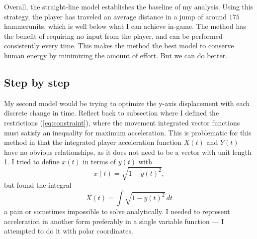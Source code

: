 Overall, the straight-line model establishes the baseline of my analysis. Using this strategy, the player has traveled an average distance in a jump of around $175$ hammerunits, which is well below what I can achieve in-game. The method has the benefit of requiring no input from the player, and can be performed consistently every  time. This makes the method the best model to conserve human energy by minimizing the amount of effort. But we can do better.





\subsection{Step by step}
My second model would be trying to optimize the y-axis displacement with each discrete change in time. Reflect back to subsection where I defined the restrictions (\ref{eq:constraint}), where the movement integrated vector functions must satisfy an inequality for maximum acceleration. This is problematic for this method in that the integrated player acceleration function $X(t)$ and $Y(t)$ have no obvious relationships, as it does not need to be a vector with unit length 1. I tried to define $x(t)$ in terms of $y(t)$ with
\[
    x(t) = \sqrt{1-y(t)^2},
\]
but found the integral
\[
    X(t) = \int \sqrt{1-y(t)^2} \, dt
\]
a pain or sometimes impossible to solve analytically. I needed to represent acceleration in another form preferably in a single variable function --- I attempted to do it with polar coordinates.




